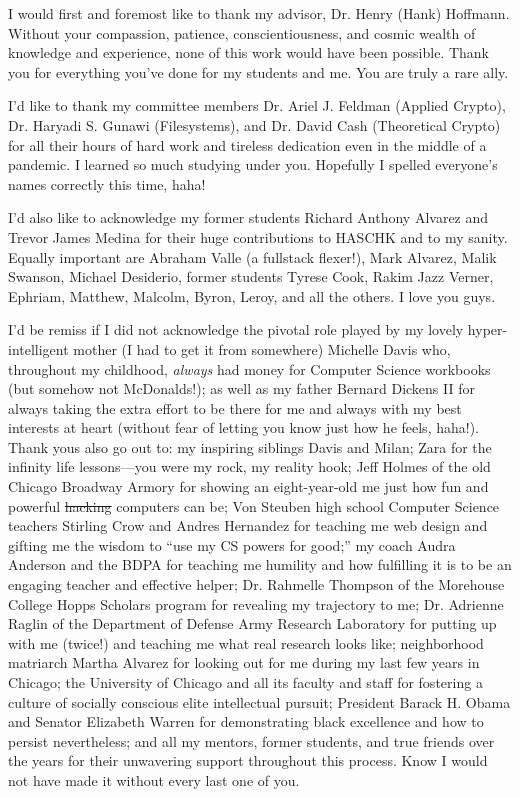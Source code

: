 \acknowledgments
I would first and foremost like to thank my advisor, Dr. Henry (Hank) Hoffmann.
Without your compassion, patience, conscientiousness, and cosmic wealth of
knowledge and experience, none of this work would have been possible. Thank you
for everything you've done for my students and me. You are truly a rare ally.

I'd like to thank my committee members Dr. Ariel J. Feldman (Applied Crypto),
Dr. Haryadi S. Gunawi (Filesystems), and Dr. David Cash (Theoretical Crypto) for
all their hours of hard work and tireless dedication even in the middle of a
pandemic. I learned so much studying under you. Hopefully I spelled everyone's
names correctly this time, haha!

I'd also like to acknowledge my former students Richard Anthony Alvarez and
Trevor James Medina for their huge contributions to HASCHK and to my sanity.
Equally important are Abraham Valle (a fullstack flexer!), Mark Alvarez, Malik
Swanson, Michael Desiderio, former students Tyrese Cook, Rakim Jazz Verner,
Ephriam, Matthew, Malcolm, Byron, Leroy, and all the others. I love you guys.

I'd be remiss if I did not acknowledge the pivotal role played by my lovely
hyper-intelligent mother (I had to get it from somewhere) Michelle Davis who,
throughout my childhood, \emph{always} had money for Computer Science workbooks
(but somehow not McDonalds!); as well as my father Bernard Dickens II for always
taking the extra effort to be there for me and always with my best interests at
heart (without fear of letting you know just how he feels, haha!). Thank yous
also go out to: my inspiring siblings Davis and Milan; Zara for the infinity
life lessons---you were my rock, my reality hook; Jeff Holmes of the old Chicago
Broadway Armory for showing an eight-year-old me just how fun and powerful
\sout{hacking} computers can be; Von Steuben high school Computer Science
teachers Stirling Crow and Andres Hernandez for teaching me web design and
gifting me the wisdom to ``use my CS powers for good;'' my coach Audra Anderson
and the BDPA for teaching me humility and how fulfilling it is to be an engaging
teacher and effective helper; Dr. Rahmelle Thompson of the Morehouse College
Hopps Scholars program for revealing my trajectory to me; Dr. Adrienne Raglin of
the Department of Defense Army Research Laboratory for putting up with me
(twice!) and teaching me what real research looks like; neighborhood matriarch
Martha Alvarez for looking out for me during my last few years in Chicago; the
University of Chicago and all its faculty and staff for fostering a culture of
socially conscious elite intellectual pursuit; President Barack H. Obama and
Senator Elizabeth Warren for demonstrating black excellence and how to persist
nevertheless; and all my mentors, former students, and true friends over the
years for their unwavering support throughout this process. Know I would not
have made it without every last one of you.

